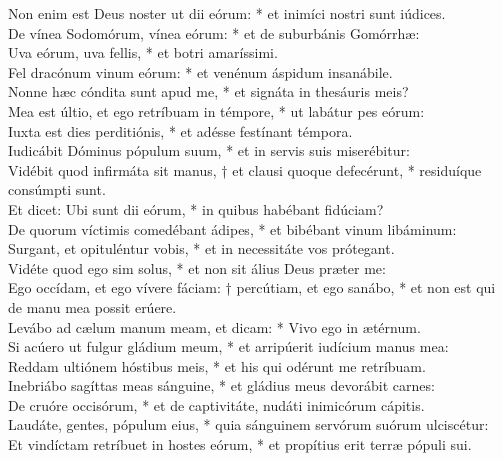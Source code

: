 {	Non enim est Deus noster ut dii eórum: * et inimíci nostri sunt iúdices. \\
	De vínea Sodomórum, vínea eórum: * et de suburbánis Gomórrhæ:  \\
	Uva eórum, uva fellis, * et botri amaríssimi. \\
	Fel dracónum vinum eórum: * et venénum áspidum insanábile. \\
	Nonne hæc cóndita sunt apud me, * et signáta in thesáuris meis? \\
	Mea est últio, et ego retríbuam in témpore, * ut labátur pes eórum:  \\
	Iuxta est dies perditiónis, * et adésse festínant témpora. \\
	Iudicábit Dóminus pópulum suum, * et in servis suis miserébitur:  \\
	Vidébit quod infirmáta sit manus, † et clausi quoque defecérunt, * residuíque consúmpti sunt. \\
	Et dicet: Ubi sunt dii eórum, * in quibus habébant fidúciam? \\
	De quorum víctimis comedébant ádipes, * et bibébant vinum libáminum:  \\
	Surgant, et opituléntur vobis, * et in necessitáte vos prótegant. \\
	Vidéte quod ego sim solus, * et non sit álius Deus præter me:  \\
	Ego occídam, et ego vívere fáciam: † percútiam, et ego sanábo, * et non est qui de manu mea possit erúere. \\
	Levábo ad cælum manum meam, et dicam: * Vivo ego in ætérnum. \\
	Si acúero ut fulgur gládium meum, * et arripúerit iudícium manus mea:  \\
	Reddam ultiónem hóstibus meis, * et his qui odérunt me retríbuam. \\
	Inebriábo sagíttas meas sánguine, * et gládius meus devorábit carnes:  \\
	De cruóre occisórum, * et de captivitáte, nudáti inimicórum cápitis. \\
	Laudáte, gentes, pópulum eius, * quia sánguinem servórum suórum ulciscétur:  \\
	Et vindíctam retríbuet in hostes eórum, * et propítius erit terræ pópuli sui.
}

